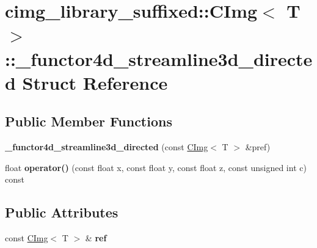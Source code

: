 \hypertarget{structcimg__library__suffixed_1_1CImg_1_1__functor4d__streamline3d__directed}{}\section{cimg\+\_\+library\+\_\+suffixed\+:\+:C\+Img$<$ T $>$\+:\+:\+\_\+functor4d\+\_\+streamline3d\+\_\+directed Struct Reference}
\label{structcimg__library__suffixed_1_1CImg_1_1__functor4d__streamline3d__directed}
\subsection*{Public Member Functions}
\begin{DoxyCompactItemize}
\item 
\mbox{\label{structcimg__library__suffixed_1_1CImg_1_1__functor4d__streamline3d__directed_ae6cf32c7a4e1b38bf10befe1c8256759}} 
{\bfseries \+\_\+functor4d\+\_\+streamline3d\+\_\+directed} (const \hyperlink{structcimg__library__suffixed_1_1CImg}{C\+Img}$<$ T $>$ \&pref)
\item 
\mbox{\label{structcimg__library__suffixed_1_1CImg_1_1__functor4d__streamline3d__directed_a5bd756077b8bcad71a8a24c4e0619d70}} 
float {\bfseries operator()} (const float x, const float y, const float z, const unsigned int c) const
\end{DoxyCompactItemize}
\subsection*{Public Attributes}
\begin{DoxyCompactItemize}
\item 
\mbox{\label{structcimg__library__suffixed_1_1CImg_1_1__functor4d__streamline3d__directed_a1388dcdcefe2dbf80bacf81e4fb29673}} 
const \hyperlink{structcimg__library__suffixed_1_1CImg}{C\+Img}$<$ T $>$ \& {\bfseries ref}
\end{DoxyCompactItemize}


